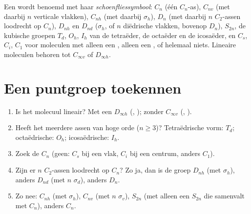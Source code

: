 \begin{definition}[Schoenfliessymbool]\label{def:b3:point-groups:schoenflies}
Een  wordt benoemd met haar
\emph{schoenfliessymbool}:
$C_n$ (één $C_n$-as), $C_{nv}$ (met daarbij $n$ verticale vlakken), $C_{nh}$
(met daarbij $\sigma_h$), $D_n$ (met daarbij $n$ $C_2$-assen loodrecht op $C_n$), $D_{nh}$
en $D_{nd}$ ($\sigma_h$, of $n$ diëdrische vlakken, bovenop $D_n$), $S_{2n}$, de
kubische groepen $T_d$, $O_h$, $I_h$ van de tetraëder, de octaëder en de
icosaëder, en $C_s$, $C_i$, $C_1$ voor moleculen met alleen een ,
alleen een , of helemaal niets. Lineaire moleculen behoren
tot $C_{\infty v}$ of $D_{\infty h}$.
\end{definition}

\section{Een puntgroep toekennen}

\begin{method}\label{met:b3:point-groups:assign}
\begin{enumerate}
  \item Is het molecuul lineair? Met een  $D_{\infty h}$
        (, ); zonder $C_{\infty v}$ (, ).
  \item Heeft het meerdere assen van hoge orde ($n \ge 3$)? Tetraëdrische vorm:
        $T_d$; octaëdrische: $O_h$; icosaëdrische: $I_h$.
  \item Zoek de  $C_n$ (geen: $C_s$ bij een vlak, $C_i$ bij een
        centrum, anders $C_1$).
  \item Zijn er $n$ $C_2$-assen loodrecht op $C_n$? Zo ja, dan is de groep
        $D_{nh}$ (met $\sigma_h$), anders $D_{nd}$ (met $n$ $\sigma_d$), anders
        $D_n$.
  \item Zo nee: $C_{nh}$ (met $\sigma_h$), $C_{nv}$ (met $n$ $\sigma_v$), $S_{2n}$
        (met alleen een $S_{2n}$ die samenvalt met $C_n$), anders $C_n$.
\end{enumerate}
\end{method}

